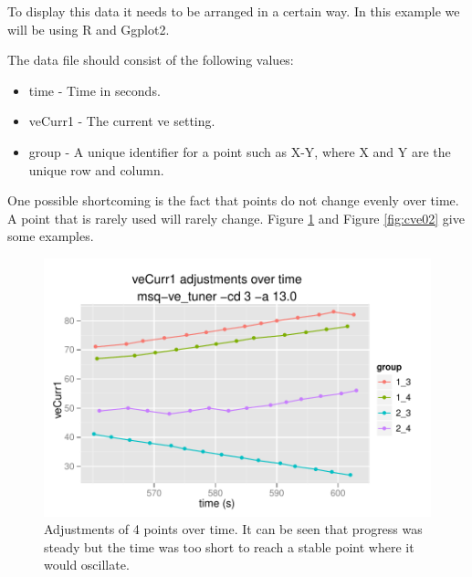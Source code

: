 \documentclass{article}
\begin{document}
To display this data it needs to be arranged in a certain way.
In this example we will be using R\cite{R} and Ggplot2\cite{wickham2009ggplot2}.

The data file should consist of the following values:
\begin{itemize}
\item time - Time in seconds.
\item veCurr1 - The current ve setting.
\item group - A unique identifier for a point such as X-Y, where
  X and Y are the unique row and column.
\end{itemize}

One possible shortcoming is the fact that points do not change
evenly over time.
A point that is rarely used will rarely change.
Figure \ref{fig:cve01} and Figure \ref{fig:cve02} give some examples.

\begin{figure}
\center
\includegraphics[scale=0.7]{analyze/cve/cve-4point-cd3.pdf}
\caption{Adjustments of 4 points over time.  It can be seen
that progress was steady but the time was too short to reach
a stable point where it would oscillate.}
\label{fig:cve01}
\end{figure}
\end{document}

